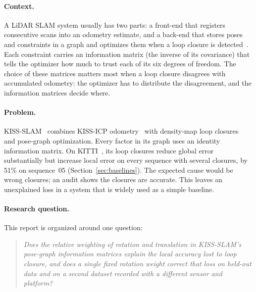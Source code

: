 \documentclass[11pt,a4paper]{article}
\begin{document}
\paragraph{Context.} A LiDAR SLAM system usually has two parts: a front-end that registers consecutive scans
into an odometry estimate, and a back-end that stores poses and constraints in a graph and optimizes them when
a loop closure is detected~\cite{g2o,gtsam}. Each constraint carries an information matrix (the inverse of its
covariance) that tells the optimizer how much to trust each of its six degrees of freedom. The choice of these
matrices matters most when a loop closure disagrees with accumulated odometry: the optimizer has to distribute
the disagreement, and the information matrices decide where.

\paragraph{Problem.} KISS-SLAM~\cite{kissslam} combines KISS-ICP odometry~\cite{kissicp} with density-map
loop closures~\cite{mapclosures} and pose-graph optimization. Every factor in its graph uses an identity
information matrix. On KITTI~\cite{kitti}, its loop closures reduce global error substantially but increase
local error on every sequence with several closures, by 51\% on sequence~05 (Section~\ref{sec:baselines}).
The expected cause would be wrong closures; an audit shows the closures are accurate. This leaves an
unexplained loss in a system that is widely used as a simple baseline.

\paragraph{Research question.} This report is organized around one question:
\begin{quote}
\emph{Does the relative weighting of rotation and translation in KISS-SLAM's pose-graph information matrices
explain the local accuracy lost to loop closure, and does a single fixed rotation weight correct that loss on
held-out data and on a second dataset recorded with a different sensor and platform?}
\end{quote}
\end{document}
